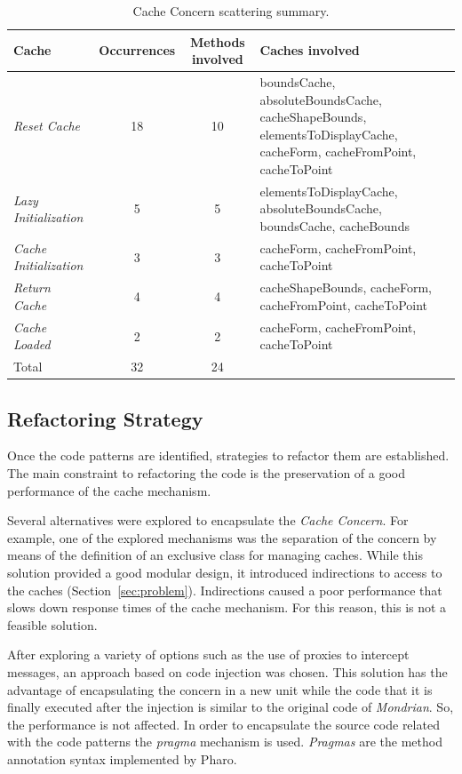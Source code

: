 \documentclass[runningheads]{llncs}
\newcommand{\secref}[1]{Section~\ref{sec:#1}\xspace}
\begin{document}
%
\begin{table}
\begin{centering}
\begin{tabular}{|p{2.5cm}|c|c|p{3.5cm}|}
\hline 
Cache  & Occurrences  & Methods involved  & Caches involved\tabularnewline
\hline
\hline 
\emph{Reset Cache}  & 18 & 10 & boundsCache, absoluteBoundsCache, cacheShapeBounds, elementsToDisplayCache,
cacheForm, cacheFromPoint, cacheToPoint\tabularnewline
\hline 
\emph{Lazy Initialization}  & 5 & 5 & elementsToDisplayCache, absoluteBoundsCache, boundsCache, cacheBounds\tabularnewline
\hline 
\emph{Cache Initialization}  & 3 & 3 & cacheForm, cacheFromPoint, cacheToPoint\tabularnewline
\hline 
\emph{Return Cache}  & 4 & 4 & cacheShapeBounds, cacheForm, cacheFromPoint, cacheToPoint\tabularnewline
\hline 
\emph{Cache Loaded} & 2 & 2 & cacheForm, cacheFromPoint, cacheToPoint\tabularnewline
\hline 
Total  & 32 & 24 & \multicolumn{1}{c}{}\tabularnewline
\cline{1-3} 
\end{tabular}
\par\end{centering}

\caption{Cache Concern scattering summary.\label{tab:Cache-Concern-scattering}}

\end{table}



\subsection{Refactoring Strategy}

Once the code patterns are identified, strategies to refactor them
are established. The main constraint to refactoring the code is the
preservation of a good performance of the cache mechanism.

Several alternatives were explored to encapsulate the \emph{Cache
Concern}. For example, one of the explored mechanisms was the separation
of the concern by means of the definition of an exclusive class for
managing caches. While this solution provided a good modular design,
it introduced indirections to access to the caches (\secref{problem}).
Indirections caused a poor performance that slows down response times
of the cache mechanism. For this reason, this is not a feasible solution.

After exploring a variety of options such as the use of proxies to
intercept messages, an approach based on code injection was chosen.
This solution has the advantage of encapsulating the concern in a
new unit while the code that it is finally executed after the injection
is similar to the original code of \emph{Mondrian}. So, the performance
is not affected. In order to encapsulate the source code related with
the code patterns the \emph{pragma} mechanism is used. \emph{Pragmas}
are the method annotation syntax implemented by Pharo.
\end{document}
